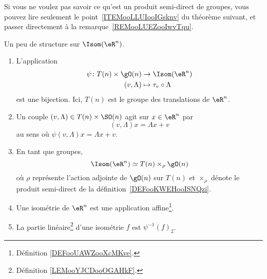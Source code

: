 Si vous ne voulez pas savoir ce qu'est un produit semi-direct de groupes, vous pouvez lire seulement le point~\ref{ITEMooLLUIooIGsknv} du théorème suivant, et passer directement à la remarque~\ref{REMooLUEZooIwvTqu}.
\begin{theorem}     \label{THOooQJSRooMrqQct}
	Un peu de structure sur \( \Isom(\eR^n)\).
	\begin{enumerate}
		\item       \label{ITEMooLLUIooIGsknv}
		      L'application
		      \begin{equation}
			      \begin{aligned}
				      \psi\colon T(n)\times \gO(n) & \to \Isom(\eR^n)           \\
				      (v,\Lambda)                  & \mapsto \tau_v\circ\Lambda
			      \end{aligned}
		      \end{equation}
		      est une bijection. Ici,  \( T(n)\) est le groupe des translations de \( \eR^n\).
		\item
		      Un couple \( (v,\Lambda)\in T(n)\times\SO(n)\) agit sur \( x\in \eR^n\) par
		      \begin{equation}
			      (v,\Lambda)x=\Lambda x+v
		      \end{equation}
		      au sens où \( \psi(v,\Lambda)x=\Lambda x+v\).
		\item       \label{ITEMooEWSIooNKzRxB}
		      En tant que groupes,
		      \begin{equation}
			      \Isom(\eR^n)\simeq T(n)\times_{\rho}\gO(n)
		      \end{equation}
		      où \( \rho\) représente l'action adjointe de \( \gO(n)\) sur \( T(n)\) et \( \times_{\rho}\) dénote le produit semi-direct de la définition~\ref{DEFooKWEHooISNQzi}.
          \item     \label{ITEMooSKUPooBDvNWX}
              Une isométrie de \( \eR^n\) est une application affine\footnote{Définition \ref{DEFooUAWZooXcMKve}.}.
          \item     \label{ITEMooQLNPooSyHaps}
              La partie linéaire\footnote{Définition \ref{LEMooYJCDooOGAHkF}.} d'une isométrie \( f\) est \( \psi^{-1}(f)_2\).
	\end{enumerate}
\end{theorem}

